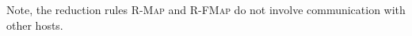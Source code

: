 \documentclass{article}
\theoremstyle{definition}
\begin{document}
Note, the reduction rules \textsc{R-Map} and \textsc{R-FMap} do not involve communication with other hosts.

\newpage

%
%

%
%
%
%
%
%
%
%
\end{document}
